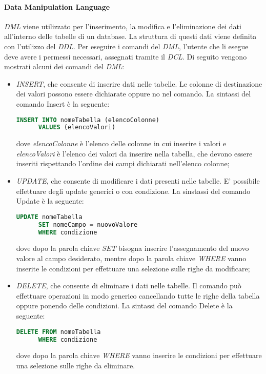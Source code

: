   \paragraph{Data Manipulation Language}
  \textit{DML} viene utilizzato per l'inserimento, la modifica e l'eliminazione dei dati all'interno delle tabelle
  di un database. La struttura di questi dati viene definita con l'utilizzo del \textit{DDL}. Per eseguire i comandi del \textit{DML}, l'utente
  che li esegue deve avere i permessi necessari, assegnati tramite il \textit{DCL}. Di seguito vengono mostrati alcuni dei 
  comandi del \textit{DML}:
  \begin{itemize}
    \item \textit{INSERT}, che consente di inserire dati nelle tabelle. Le colonne di destinazione dei valori possono
    essere dichiarate oppure no nel comando. La sintassi del comando Insert è la seguente:
    \begin{lstlisting}[language=sql]
      INSERT INTO nomeTabella (elencoColonne)
      VALUES (elencoValori)
    \end{lstlisting}
    dove \textit{elencoColonne} è l'elenco delle colonne in cui inserire i valori e \textit{elencoValori} è l'elenco
    dei valori da inserire nella tabella, che devono essere inseriti rispettando l'ordine dei campi dichiarati nell'elenco colonne;
    \item \textit{UPDATE}, che consente di modificare i dati presenti nelle tabelle. E' possibile effettuare degli update generici
    o con condizione. La sinstassi del comando Update è la seguente:
    \begin{lstlisting}[language=sql]
      UPDATE nomeTabella 
      SET nomeCampo = nuovoValore 
      WHERE condizione
    \end{lstlisting}
    dove dopo la parola chiave \textit{SET} bisogna inserire l'assegnamento del nuovo valore al campo desiderato, mentre dopo
    la parola chiave \textit{WHERE} vanno inserite le condizioni per effettuare una selezione sulle righe da modificare; 
    \item \textit{DELETE}, che consente di eliminare i dati nelle tabelle. Il comando può effettuare operazioni in modo generico
    cancellando tutte le righe della tabella oppure ponendo delle condizioni. La sintassi del comando Delete è la seguente:
    \begin{lstlisting}[language=sql]
      DELETE FROM nomeTabella 
      WHERE condizione
    \end{lstlisting}
    dove dopo la parola chiave \textit{WHERE} vanno inserire le condizioni per effettuare una selezione sulle righe da 
    eliminare. 
  \end{itemize}
  

